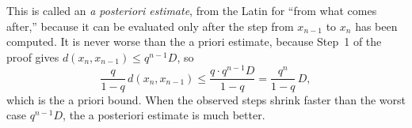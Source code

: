 This is called an \emph{a posteriori estimate}, from the Latin for ``from what comes after,'' because it can be evaluated only after the step from $x_{n-1}$ to $x_n$ has been computed. It is never worse than the a priori estimate, because Step~1 of the proof gives $d(x_n,x_{n-1})\le q^{n-1}D$, so
\[
\frac{q}{1-q}\,d(x_n,x_{n-1})\le\frac{q\cdot q^{n-1}D}{1-q}=\frac{q^n}{1-q}\,D,
\]
which is the a priori bound. When the observed steps shrink faster than the worst case $q^{n-1}D$, the a posteriori estimate is much better.

